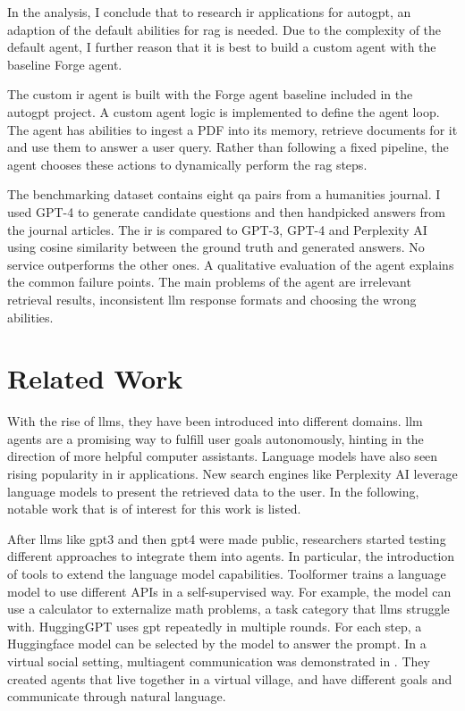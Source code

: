 \documentclass[../main.tex]{subfiles}
\begin{document}
In the analysis, I conclude that to research \gls{ir} applications for \gls{autogpt},
an adaption of the default abilities for \gls{rag} is needed.
Due to the complexity of the default agent,
I further reason that it is best to build a custom agent with the baseline Forge agent.

The custom \gls{ir} agent is built with the Forge agent baseline included in the
\gls{autogpt} project.
A custom agent logic is implemented to define the agent loop.
The agent has abilities to ingest a PDF into its memory, retrieve documents for it
and use them to answer a user query.
Rather than following a fixed pipeline, the agent chooses these actions to
dynamically perform the \gls{rag} steps.

The benchmarking dataset contains eight \gls{qa} pairs from a humanities journal.
I used GPT-4 to generate candidate questions and then handpicked answers from
the journal articles.
The \gls{ir} is compared to GPT-3, GPT-4 and Perplexity AI
using cosine similarity between the ground truth and generated answers.
No service outperforms the other ones.
A qualitative evaluation of the agent explains the common failure points.
The main problems of the agent are irrelevant retrieval results,
inconsistent \gls{llm} response formats and choosing the wrong abilities.

\section{Related Work}

With the rise of \glspl{llm}, they have been introduced into different domains.
\Gls{llm} agents are a promising way to fulfill user goals autonomously,
hinting in the direction of more helpful computer assistants.
Language models have also seen rising popularity in \gls{ir} applications.
New search engines like Perplexity AI leverage language models
to present the retrieved data to the user.
In the following,
notable work that is of interest for this work is listed.

After \glspl{llm} like \gls{gpt3} and then \gls{gpt4} were made public,
researchers started testing different approaches to integrate them into agents.
In particular, the introduction of tools to extend the language model capabilities.
Toolformer \cite{Schick2023} trains a language model to use different APIs in a self-supervised way.
For example, the model can use a calculator to externalize math problems,
a task category that \glspl{llm} struggle with.
HuggingGPT \cite{Shen2023} uses \gls{gpt} repeatedly in multiple rounds.
For each step, a Huggingface model can be selected by the model to answer the prompt.
In a virtual social setting, multiagent communication was demonstrated in \autocite{Park2023}.
They created agents that live together in a virtual village,
and have different goals and communicate through natural language.
\end{document}
